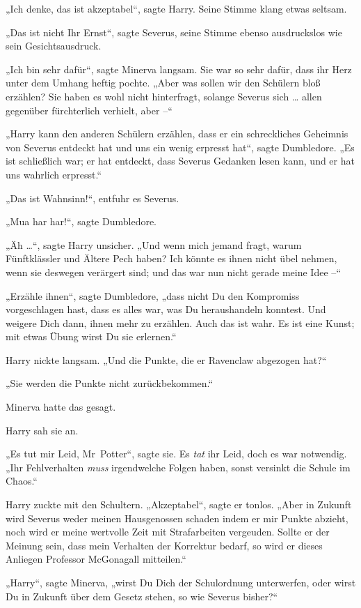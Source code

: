 „Ich denke, das ist akzeptabel“, sagte Harry. Seine Stimme klang etwas seltsam. 

„Das ist nicht Ihr Ernst“, sagte Severus, seine Stimme ebenso ausdruckslos wie sein Gesichtsausdruck. 

„Ich bin sehr dafür“, sagte Minerva langsam. Sie war so sehr dafür, dass ihr Herz unter dem Umhang heftig pochte. „Aber was sollen wir den Schülern bloß erzählen? Sie haben es wohl nicht hinterfragt, solange Severus sich … allen gegenüber fürchterlich verhielt, aber –“ 

„Harry kann den anderen Schülern erzählen, dass er ein schreckliches Geheimnis von Severus entdeckt hat und uns ein wenig erpresst hat“, sagte Dumbledore. „Es ist schließlich war; er hat entdeckt, dass Severus Gedanken lesen kann, und er hat uns wahrlich erpresst.“ 

„Das ist Wahnsinn!“, entfuhr es Severus. 

„Mua har har!“, sagte Dumbledore. 

„Äh …“, sagte Harry unsicher. „Und wenn mich jemand fragt, warum Fünftklässler und Ältere Pech haben? Ich könnte es ihnen nicht übel nehmen, wenn sie deswegen verärgert sind; und das war nun nicht gerade meine Idee –“ 

„Erzähle ihnen“, sagte Dumbledore, „dass nicht Du den Kompromiss vorgeschlagen hast, dass es alles war, was Du heraushandeln konntest. Und weigere Dich dann, ihnen mehr zu erzählen. Auch das ist wahr. Es ist eine Kunst; mit etwas Übung wirst Du sie erlernen.“ 

Harry nickte langsam. „Und die Punkte, die er Ravenclaw abgezogen hat?“ 

„Sie werden die Punkte nicht zurückbekommen.“ 

Minerva hatte das gesagt. 

Harry sah sie an. 

„Es tut mir Leid, Mr~Potter“, sagte sie. Es \emph{tat} ihr Leid, doch es war notwendig. „Ihr Fehlverhalten \emph{muss} irgendwelche Folgen haben, sonst versinkt die Schule im Chaos.“ 

Harry zuckte mit den Schultern. „Akzeptabel“, sagte er tonlos. „Aber in Zukunft wird Severus weder meinen Hausgenossen schaden indem er mir Punkte abzieht, noch wird er meine wertvolle Zeit mit Strafarbeiten vergeuden. Sollte er der Meinung sein, dass mein Verhalten der Korrektur bedarf, so wird er dieses Anliegen Professor McGonagall mitteilen.“ 

„Harry“, sagte Minerva, „wirst Du Dich der Schulordnung unterwerfen, oder wirst Du in Zukunft über dem Gesetz stehen, so wie Severus bisher?“ 

